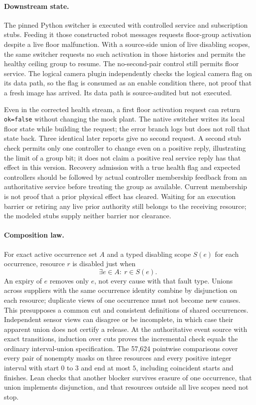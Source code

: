 \documentclass{article}
\begin{document}
\paragraph{Downstream state.}
The pinned Python switcher is executed with controlled service and
subscription stubs. Feeding it those constructed robot messages requests
floor-group activation despite a live floor malfunction. With a
source-side union of live disabling scopes, the same switcher requests
no such activation in those histories and permits the healthy ceiling
group to resume. The no-second-pair control still permits floor service.
The logical camera plugin independently checks the logical camera flag
on its data path, so the flag is consumed as an enable condition there,
not proof that a fresh image has arrived. Its data path is source-audited
but not executed.

Even in the corrected health stream, a first floor activation request
can return \texttt{ok=false} without changing the mock plant. The native
switcher writes its local floor state while building the request; the
error branch logs but does not roll that state back. Three identical
later reports give no second request. A second stub check permits only
one controller to change even on a positive reply, illustrating the
limit of a group bit; it does not claim a positive real service reply
has that effect in this version. Recovery admission with a true health
flag and expected controllers should be followed by actual controller
membership feedback from an authoritative service before treating the
group as available. Current membership is not proof that a prior
physical effect has cleared. Waiting for an execution barrier or
retiring any live prior authority still belongs to the receiving
resource; the modeled stubs supply neither barrier nor clearance.

\paragraph{Composition law.}
For exact active occurrence set \(A\) and a typed disabling scope
\(S(e)\) for each occurrence, resource \(r\) is disabled just when
\[
  \exists e\in A:\ r\in S(e).
\]
An expiry of \(e\) removes only \(e\), not every cause with that fault
type. Unions across suppliers with the same occurrence identity
combine by disjunction on each resource; duplicate views of one
occurrence must not become new causes. This presupposes a common cut
and consistent definitions of shared occurrences. Independent sensor
views can disagree or be incomplete, in which case their apparent
union does not certify a release. At the authoritative event source
with exact transitions, induction over cuts proves the incremental
check equals the ordinary interval-union specification. The 57,624
pointwise comparisons cover every pair of nonempty masks on three
resources and every positive integer interval with start \(0\) to \(3\)
and end at most \(5\), including coincident starts and finishes.
Lean checks that another blocker survives erasure of one occurrence,
that union implements disjunction, and that resources outside all live
scopes need not stop.
\end{document}
